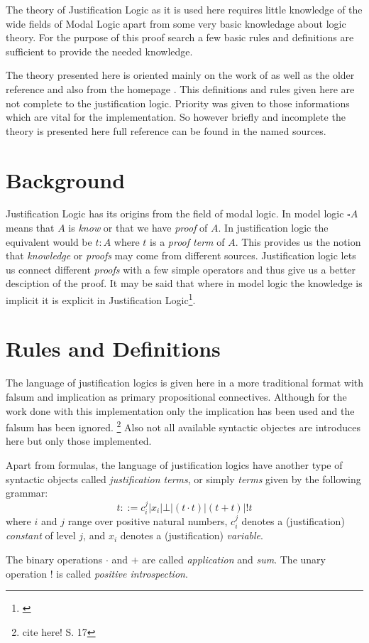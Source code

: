 The theory of Justification Logic as it is used here requires little knowledge of the wide fields of Modal Logic apart from some very basic knowledage about logic theory. For the purpose of this proof search a few basic rules and definitions are sufficient to provide the needed knowledge. 
\par

 The theory presented here is oriented mainly on the work of \cite{goet} as well as the older reference \cite{art} and also from the homepage \cite{stan}. This definitions and rules given here are not complete to the justification logic. Priority was given to those informations which are vital for the implementation. So however briefly and incomplete the theory is presented here full reference can be found in the named sources. 

\section{Background}
Justification Logic has its origins from the field of modal logic. 
In model logic $\square A$ means that $A$ is \emph{know} or that we have \emph{proof} of $A$. In justification logic the equivalent would be $t:A$ where $t$ is a \emph{proof term} of $A$. This provides us the notion that \emph{knowledge} or \emph{proofs} may come from different sources. Justification logic lets us connect different \emph{proofs} with a few simple operators and thus give us a better desciption of the proof. It may be said that where in model logic the knowledge is implicit it is explicit in Justification Logic\footnote{\cite{goet}}.

\section{Rules and Definitions}

The language of justification logics is given here in a more traditional format with falsum and implication as primary propositional connectives. Although for the work done with this implementation only the implication has been used and the falsum has been ignored. \footnote{cite here! S. 17} Also not all available syntactic objectes are introduces here but only those implemented.

\begin{definition}\label{justification_terms} Apart from formulas, the language of justification logics have another type of syntactic objects called \emph{justification terms}, or simply \emph{terms} given by the following grammar:
\[
	t::= c_{i}^{j} | x_i | \bot | (t \cdot t) | (t+t) | !t
\]
where $i$ and $j$ range over positive natural numbers, $c_{i}^{j}$ denotes a (justification) \emph{constant} of level $j$, and $x_i$ denotes a (justification) \emph{variable}.

The binary operations $\cdot$ and $+$ are called \emph{application} and \emph{sum}. The unary operation $!$ is called \emph{positive introspection}.
\end{definition}

